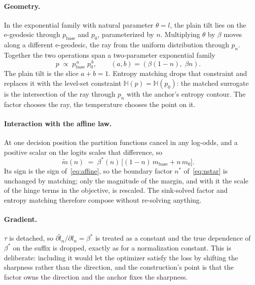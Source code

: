 \documentclass[11pt,a4paper]{article}
\begin{document}
\paragraph{Geometry.} In the exponential family with natural parameter $\theta = l$, the plain tilt
lies on the e-geodesic through $p_{\mathrm{base}}$ and $p_0$, parameterized by $n$. Multiplying
$\theta$ by $\beta$ moves along a different e-geodesic, the ray from the uniform distribution
through $p_n$. Together the two operations span a two-parameter exponential family
\begin{equation}
  p \;\propto\; p_{\mathrm{base}}^{\,a}\; p_0^{\,b},
  \qquad (a, b) = \left(\beta(1 - n),\; \beta n\right).
  \label{eq:twoparam}
\end{equation}
The plain tilt is the slice $a + b = 1$. Entropy matching drops that constraint and replaces it with
the level-set constraint $\mathbb{H}(p) = \mathbb{H}(p_0)$: the matched surrogate is the
intersection of the ray through $p_n$ with the anchor's entropy contour. The factor chooses the
ray, the temperature chooses the point on it.

\paragraph{Interaction with the affine law.} At one decision position the partition functions
cancel in any log-odds, and a positive scalar on the logits scales that difference, so
\begin{equation}
  \tilde{m}(n) \;=\; \beta^{*}(n)\,\big[(1 - n)\, m_{\mathrm{base}} + n\, m_0\big].
  \label{eq:affinematched}
\end{equation}
Its sign is the sign of~\eqref{eq:affine}, so the boundary factor $n^{*}$ of~\eqref{eq:nstar} is
unchanged by matching; only the magnitude of the margin, and with it the scale of the hinge terms
in the objective, is rescaled. The sink-solved factor and entropy matching therefore compose
without re-solving anything.

\paragraph{Gradient.} $\tau$ is detached, so $\partial \tilde{l}_n / \partial l_n = \beta^{*}$ is
treated as a constant and the true dependence of $\beta^{*}$ on the suffix is dropped, exactly as
for a normalization constant. This is deliberate: including it would let the optimizer satisfy the
loss by shifting the sharpness rather than the direction, and the construction's point is that the
factor owns the direction and the anchor fixes the sharpness.
\end{document}

